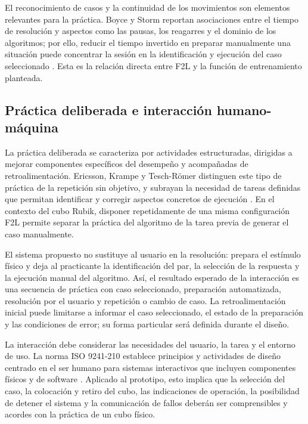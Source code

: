 El reconocimiento de casos y la continuidad de los movimientos son elementos relevantes para la práctica. Boyce y Storm reportan asociaciones entre el tiempo de resolución y aspectos como las pausas, los reagarres y el dominio de los algoritmos; por ello, reducir el tiempo invertido en preparar manualmente una situación puede concentrar la sesión en la identificación y ejecución del caso seleccionado \cite{Boyce2022}. Esta es la relación directa entre F2L y la función de entrenamiento planteada.

\subsection{Práctica deliberada e interacción humano-máquina}

La práctica deliberada se caracteriza por actividades estructuradas, dirigidas a mejorar componentes específicos del desempeño y acompañadas de retroalimentación. Ericsson, Krampe y Tesch-Römer distinguen este tipo de práctica de la repetición sin objetivo, y subrayan la necesidad de tareas definidas que permitan identificar y corregir aspectos concretos de ejecución \cite{Ericsson1993}. En el contexto del cubo Rubik, disponer repetidamente de una misma configuración F2L permite separar la práctica del algoritmo de la tarea previa de generar el caso manualmente.

El sistema propuesto no sustituye al usuario en la resolución: prepara el estímulo físico y deja al practicante la identificación del par, la selección de la respuesta y la ejecución manual del algoritmo. Así, el resultado esperado de la interacción es una secuencia de práctica con caso seleccionado, preparación automatizada, resolución por el usuario y repetición o cambio de caso. La retroalimentación inicial puede limitarse a informar el caso seleccionado, el estado de la preparación y las condiciones de error; su forma particular será definida durante el diseño.

La interacción debe considerar las necesidades del usuario, la tarea y el entorno de uso. La norma ISO 9241-210 establece principios y actividades de diseño centrado en el ser humano para sistemas interactivos que incluyen componentes físicos y de software \cite{ISO9241_210_2019}. Aplicado al prototipo, esto implica que la selección del caso, la colocación y retiro del cubo, las indicaciones de operación, la posibilidad de detener el sistema y la comunicación de fallos deberán ser comprensibles y acordes con la práctica de un cubo físico.

